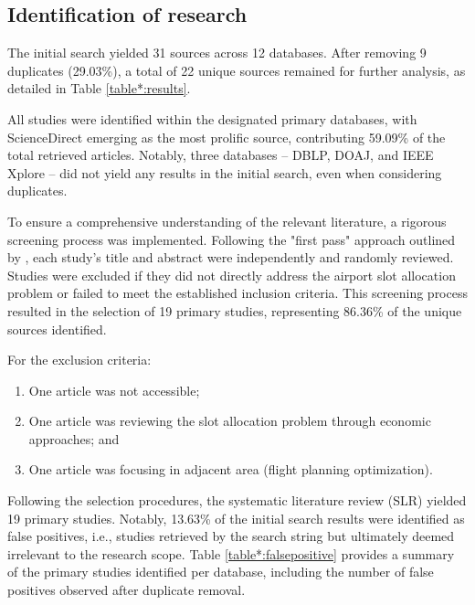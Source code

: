 \subsection{Identification of research}

The initial search yielded 31 sources across 12 databases.
%
After removing 9 duplicates (29.03\%), a total of 22 unique sources remained for
further analysis, as detailed in Table \ref{table*:results}.





All studies were identified within the designated primary databases, with
ScienceDirect emerging as the most prolific source, contributing 59.09\% of the
total retrieved articles.
%
Notably, three databases – \acrshort{DBLP}, \acrshort{DOAJ}, and IEEE Xplore –
did not yield any results in the initial search, even when considering
duplicates.



To ensure a comprehensive understanding of the relevant literature, a rigorous
screening process was implemented.
%
Following the "first pass" approach outlined by
, each study's title and abstract were
independently and randomly reviewed.
%
Studies were excluded if they did not directly address the airport slot
allocation problem or failed to meet the established inclusion criteria.
%
This screening process resulted in the selection of 19 primary studies,
representing 86.36\% of the unique sources identified.



For the exclusion criteria: 
\begin{enumerate}
    \item One article was not accessible;
    \item One article was reviewing the slot allocation problem through economic approaches; and
    \item One article was focusing in adjacent area (flight planning optimization).
\end{enumerate}



Following the selection procedures, the systematic literature review (SLR)
yielded 19 primary studies.
%
Notably, 13.63\% of the initial search results were identified as false
positives, i.e., studies retrieved by the search string but ultimately deemed
irrelevant to the research scope.
%
Table \ref{table*:falsepositive} provides a summary of the primary studies
identified per database, including the number of false positives observed after
duplicate removal.



